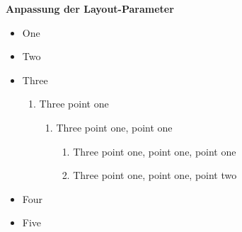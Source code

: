 \documentclass[a5paper]{article}
\begin{document}
\textbf{Anpassung der Layout-Parameter}



\begin{itemize}[leftmargin=2cm]
\item One
\item Two
\item Three
\begin{enumerate}
    \item Three point one
    \begin{enumerate}
    \item Three point one, point one
        \begin{enumerate}
        \item Three point one, point one, point one
        \item Three point one, point one, point two
        \end{enumerate}
    \end{enumerate}
\end{enumerate}
\item Four
\item Five
\end{itemize}
\end{document}
